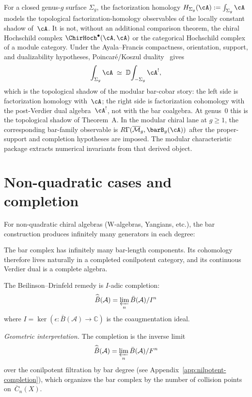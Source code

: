 \begin{remark}
\label{rem:surface-observables-fh}
For a closed genus-$g$ surface $\Sigma_g$, the factorization
homology
$H_{\Sigma_g}(\cA) := \int_{\Sigma_g} \cA$
models the topological factorization-homology observables of the
locally constant shadow of~$\cA$. It is not, without an additional
comparison theorem, the chiral Hochschild complex
$\ChirHoch^\bullet(\cA,\cA)$ or the categorical Hochschild complex of
a module category. Under the Ayala--Francis compactness,
orientation, support, and dualizability hypotheses,
Poincar\'e/Koszul duality~\cite{AF15} gives
\[
\int_{\Sigma_g} \cA
\;\simeq\;
\mathbb{D}\!\int_{-\Sigma_g} \cA^!,
\]
which is the topological shadow of the modular bar-cobar story:
the left side is factorization homology with~$\cA$; the right
side is factorization cohomology with the post-Verdier dual
algebra~$\cA^!$, not with the bar coalgebra. At genus~$0$ this is
the topological shadow of Theorem~A. In the modular chiral lane at
$g \geq 1$, the corresponding bar-family observable is
$R\Gamma(\overline{\mathcal{M}}_g,\barB_g(\cA))$ after the
proper-support and completion hypotheses are imposed. The modular
characteristic package extracts numerical invariants from that
derived object.
\end{remark}

\section{Non-quadratic cases and completion}

\begin{remark}\label{rem:why-completion}
For non-quadratic chiral algebras (W-algebras, Yangians, etc.), the bar construction produces infinitely many generators in each degree:

The bar complex has infinitely many bar-length components.  Its
cohomology therefore lives naturally in a completed conilpotent
category, and its continuous Verdier dual is a complete algebra.

The Beilinson--Drinfeld remedy is $I$-adic completion:
\[\widehat{\bar{B}}(\mathcal{A}) = \varprojlim_n \bar{B}(\mathcal{A})/I^n\]
where $I = \ker(\epsilon: \bar{B}(\mathcal{A}) \to \mathbb{C})$ is the coaugmentation ideal.

\emph{Geometric interpretation.} The completion is the inverse limit
\[\widehat{\bar{B}}(\mathcal{A}) = \varprojlim_n \bar{B}(\mathcal{A})/F^n\]
over the conilpotent filtration by bar degree (see Appendix~\ref{app:nilpotent-completion}), which organizes the bar complex by the number of collision points on~$\overline{C}_n(X)$.
\end{remark}

